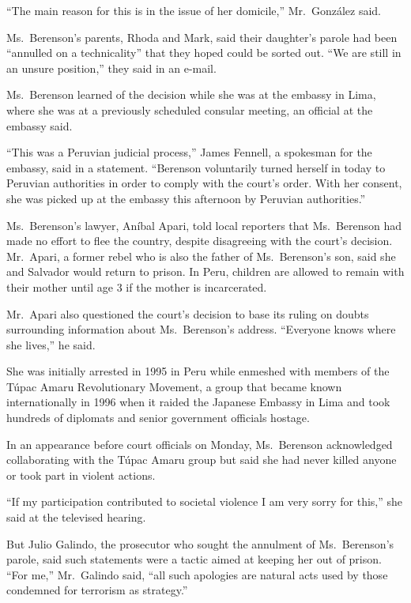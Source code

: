 ﻿\documentclass[12pt]{article}
\begin{document}
``The main reason for this is in the issue of her domicile,'' Mr.~Gonz\'alez said.

Ms.~Berenson's parents, Rhoda and Mark, said their daughter's parole had been ``annulled on a
technicality'' that they hoped could be sorted out. ``We are still in an unsure position,'' they
said in an e-mail.

Ms.~Berenson learned of the decision while she was at the embassy in Lima, where she was at a
previously scheduled consular meeting, an official at the embassy said.

``This was a Peruvian judicial process,'' James Fennell, a spokesman for the embassy, said in a
statement. ``Berenson voluntarily turned herself in today to Peruvian authorities in order to comply
with the court's order. With her consent, she was picked up at the embassy this afternoon by
Peruvian authorities.''

Ms.~Berenson's lawyer, Aníbal Apari, told local reporters that Ms.~Berenson had made no effort to
flee the country, despite disagreeing with the court's decision. Mr.~Apari, a former rebel who is
also the father of Ms.~Berenson's son, said she and Salvador would return to prison. In Peru,
children are allowed to remain with their mother until age 3 if the mother is incarcerated.

Mr.~Apari also questioned the court's decision to base its ruling on doubts surrounding information
about Ms.~Berenson's address. ``Everyone knows where she lives,'' he said.

She was initially arrested in 1995 in Peru while enmeshed with members of the Túpac Amaru
Revolutionary Movement, a group that became known internationally in 1996 when it raided the
Japanese Embassy in Lima and took hundreds of diplomats and senior government officials hostage.

In an appearance before court officials on Monday, Ms.~Berenson acknowledged collaborating with the
Túpac Amaru group but said she had never killed anyone or took part in violent actions.

``If my participation contributed to societal violence I am very sorry for this,'' she said at the
televised hearing.

But Julio Galindo, the prosecutor who sought the annulment of Ms.~Berenson's parole, said such
statements were a tactic aimed at keeping her out of prison. ``For me,'' Mr.~Galindo said, ``all
such apologies are natural acts used by those condemned for terrorism as strategy.''
\end{document}
